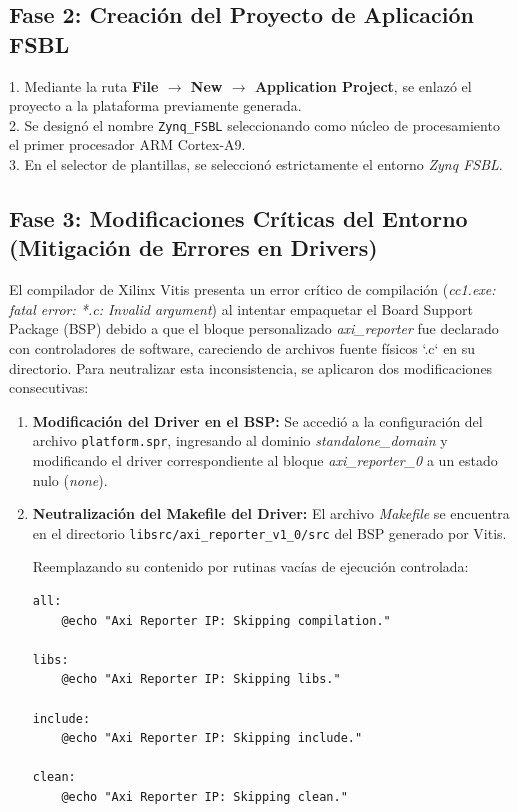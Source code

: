\subsection{Fase 2: Creación del Proyecto de Aplicación FSBL}
1. Mediante la ruta \textbf{File $\rightarrow$ New $\rightarrow$ Application Project}, se enlazó el proyecto a la plataforma previamente generada.\\
2. Se designó el nombre \texttt{Zynq\_FSBL} seleccionando como núcleo de procesamiento el primer procesador ARM Cortex-A9.\\
3. En el selector de plantillas, se seleccionó estrictamente el entorno \textit{Zynq FSBL}.

\subsection{Fase 3: Modificaciones Críticas del Entorno (Mitigación de Errores en Drivers)}
El compilador de Xilinx Vitis presenta un error crítico de compilación (\textit{cc1.exe: fatal error: *.c: Invalid argument}) al intentar empaquetar el Board Support Package (BSP) debido a que el bloque personalizado \textit{axi\_reporter} fue declarado con controladores de software, careciendo de archivos fuente físicos `.c` en su directorio. Para neutralizar esta inconsistencia, se aplicaron dos modificaciones consecutivas:

\begin{enumerate}
    \item \textbf{Modificación del Driver en el BSP:} Se accedió a la configuración del archivo \texttt{platform.spr}, ingresando al dominio \textit{standalone\_domain} y modificando el driver correspondiente al bloque \textit{axi\_reporter\_0} a un estado nulo (\textit{none}).
    \item \textbf{Neutralización del Makefile del Driver:} El archivo \textit{Makefile} se encuentra en el directorio
\texttt{libsrc/axi\_reporter\_v1\_0/src} del BSP generado por Vitis.

    Reemplazando su contenido por rutinas vacías de ejecución controlada:

\begin{lstlisting}[style=bashstyle]
all:
	@echo "Axi Reporter IP: Skipping compilation."

libs:
	@echo "Axi Reporter IP: Skipping libs."

include:
	@echo "Axi Reporter IP: Skipping include."

clean:
	@echo "Axi Reporter IP: Skipping clean."
    \end{lstlisting}
\end{enumerate}

